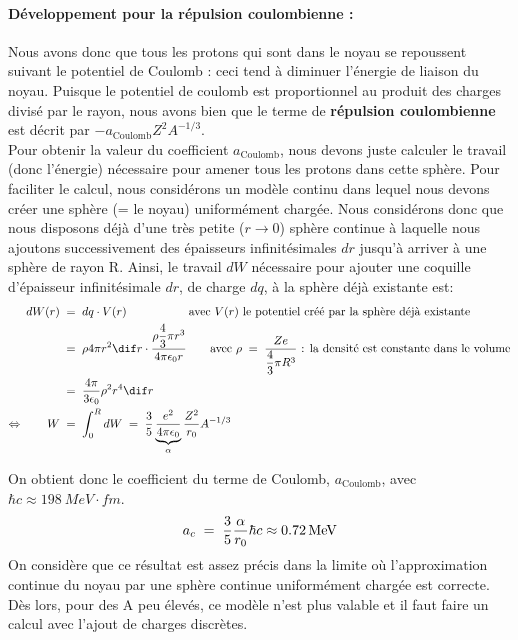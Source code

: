 \paragraph{Développement pour la répulsion coulombienne :}


Nous avons donc que tous les protons qui sont dans le noyau se repoussent suivant le potentiel de Coulomb : ceci tend à diminuer l'énergie de liaison du noyau. Puisque le potentiel de coulomb est proportionnel au produit des charges divisé par le rayon, nous avons bien que le terme de \textbf{répulsion coulombienne} est décrit par $-a_{\text{Coulomb}} Z^2 A^{-1/3}$.\\

Pour obtenir la valeur du coefficient $a_{\text{Coulomb}}$, nous devons juste calculer le travail (donc l'énergie) nécessaire pour amener tous les protons dans cette sphère. Pour faciliter le calcul, nous considérons un modèle continu dans lequel nous devons créer une sphère (= le noyau) uniformément chargée. Nous considérons donc que nous disposons déjà d'une très petite ($r \rightarrow 0$) sphère continue à laquelle nous ajoutons successivement des épaisseurs infinitésimales $dr$ jusqu'à arriver à une sphère de rayon R. Ainsi, le travail $dW$ nécessaire pour ajouter une coquille d'épaisseur infinitésimale $dr$, de charge $dq$, à la sphère déjà existante est:
\begin{align*}
    dW(r) &\eq 
    dq \cdot V(r) \qquad \qquad \quad \;\text{avec $V(r)$ le potentiel créé par la sphère déjà existante}
    \\ 
    &\eq 
    \rho 4\pi r^2 \dif r \cdot \dfrac{ \rho \dfrac{4}{3}\pi r^3}{4\pi\epsilon_0 r}
    \qquad \text{avec } \rho \eq \dfrac{Ze}{\dfrac{4}{3}\pi R^3}\text{ : la densité est constante dans le volume}\\
    &\eq
    \dfrac{4\pi}{3\epsilon_0}\rho^2 r^4 \dif r \\
    \Leftrightarrow \qquad W &\eq
    \int_0^R dW \eq \dfrac{3}{5}\underbrace{\dfrac{e^2}{4\pi\epsilon_0}}_{\alpha}\dfrac{Z^2}{r_0}A^{-1/3}
\end{align*}

On obtient donc le coefficient du terme de Coulomb, $a_{\text{Coulomb}}$, avec $\hbar c \approx \SI{198}{MeV \cdot fm}$.
\[
    a_c \; = \; \dfrac{3}{5}\dfrac{\alpha}{r_0} \hbar c \approx \SI{0.72}{MeV}
\]
On considère que ce résultat est assez précis dans la limite où l'approximation continue du noyau par une sphère continue uniformément chargée est correcte. Dès lors, pour des A peu élevés, ce modèle n'est plus valable et il faut faire un calcul avec l'ajout de charges discrètes.


